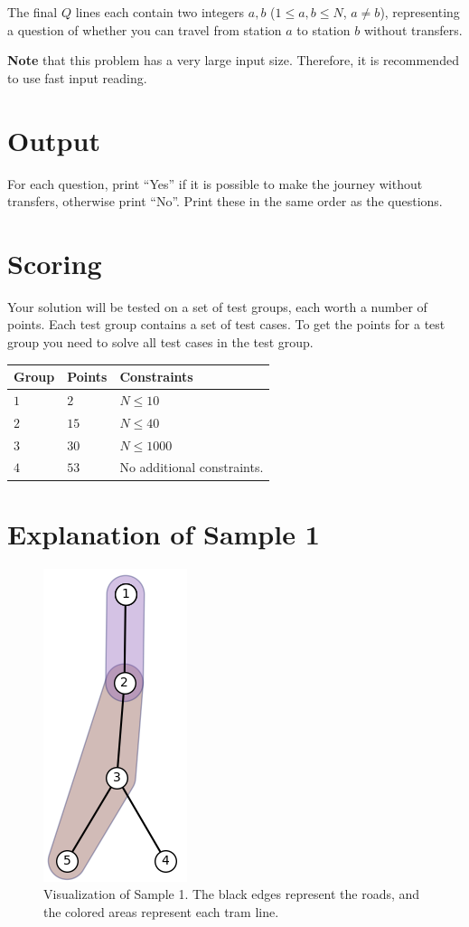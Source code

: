 The final $Q$ lines each contain two integers $a,b$ ($1 \leq a,b \leq N$, $a \neq b$), representing a question of whether you can travel from station $a$ to station $b$ without transfers. 

\textbf{Note} that this problem has a very large input size. Therefore, it is recommended to use fast input reading.

\section*{Output}
For each question, print ``Yes'' if it is possible to make the journey without transfers, otherwise
print ``No''. Print these in the same order as the questions.

\section*{Scoring}
Your solution will be tested on a set of test groups, each worth a number of points. Each test group contains
a set of test cases. To get the points for a test group you need to solve all test cases in the test group.

\noindent
\begin{tabular}{| l | l | p{12cm} |}
  \hline
  \textbf{Group} & \textbf{Points} & \textbf{Constraints} \\ \hline
  $1$    & $2$        & $N \leq 10$ \\ \hline
  $2$    & $15$       & $N \leq 40$ \\ \hline
  $3$    & $30$       & $N \leq 1000$ \\ \hline
  $4$    & $53$       & No additional constraints. \\ \hline
\end{tabular}

\section*{Explanation of Sample 1}
\begin{figure}[h]
  \centering
  \includegraphics{sample.png}
  \caption{Visualization of Sample 1. The black edges represent the roads, and the colored areas represent each tram line.}
  \label{fig:example1}
\end{figure}


